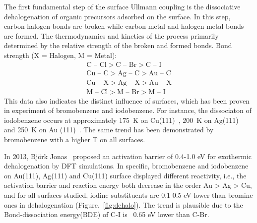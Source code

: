 \documentclass[aps,reprint,amsmath,amssymb]{revtex4-2}
\begin{document}
The first fundamental step of the surface Ullmann coupling is the dissociative dehalogenation of organic precursors adsorbed on the surface. In this step, carbon-halogen bonds are broken while carbon-metal and halogen-metal bonds are formed. The thermodynamics and kinetics of the process primarily determined by the relative strength of the broken and formed bonds. 
Bond strength (X = Halogen, M = Metal): 
%
\begin{eqnarray}
\text{C -- Cl} > \text{C -- Br} > \text{C -- I} \\
\text{Cu -- C} > \text{Ag -- C} > \text{Au -- C} \\
\text{Cu -- X} > \text{Ag -- X} > \text{Au -- X} \\
\text{M -- Cl} > \text{M -- Br} > \text{M -- I}
\end{eqnarray}
%
This data also indicates the distinct influence of surfaces, which has been proven in experiment of bromobenzene and iodobenzene. For instance, the dissociaton of iodobenzene occurs at approximately 175~K on Cu(111)~\cite{sur_sci01}, 200~K on Ag(111)~\cite{sur_sci02} and 250~K on Au (111)~\cite{sur_sci03}. The same trend has been demonstrated by bromobenzene with a higher T on all surfaces.

In 2013, Björk Jonas~\cite{jacs2013} proposed an activation barrier of 0.4-1.0 eV for exothermic dehalogenation by DFT simulations. In specific, bromobenzene and iodobenzene on Au(111), Ag(111) and Cu(111) surface displayed different reactivity, i.e., the activation barrier and reaction energy both decrease in the order Au > Ag > Cu, and for all surfaces studied, iodine substituents are 0.1-0.5 eV lower than bromine ones in dehalogenation (Figure.~\ref{fig:dehalo}). The trend is plausible due to the Bond-dissociation energy(BDE) of C-I is ~0.65 eV lower than C-Br\cite{Arpc1982}.
\end{document}
